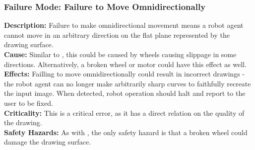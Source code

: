 \subsubsection{Failure Mode: Failure to Move Omnidirectionally}
\label{sec:locomotion_fm_omni}
\textbf{Description:} Failure to make omnidirectional movement means a robot agent cannot move in an arbitrary direction on the flat plane represented by the drawing surface.\\
\textbf{Cause:} Similar to , this could be caused by wheels causing slippage in some directions. Alternatively, a broken wheel or motor could have this effect as well.\\
\textbf{Effects:} Failling to move omnidirectionally could result in incorrect drawings - the robot agent can no longer make arbitrarily sharp curves to faithfully recreate the input image. When detected, robot operation should halt and report to the user to be fixed.\\
\textbf{Criticality:}  This is a critical error, as it has a direct relation on the quality of the drawing.\\
\textbf{Safety Hazards:} As with , the only safety hazard is that a broken wheel could damage the drawing surface.\\
